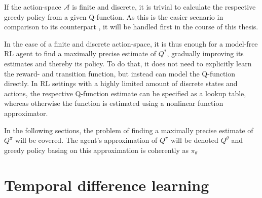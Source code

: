 If the action-space $\mathcal{A}$ is finite and discrete, it is trivial to calculate the respective greedy policy from a given Q-function. As this is the easier scenario in comparison to its counterpart , it will be handled first in the course of this thesis.

In the case of a finite and discrete action-space, it is thus enough for a model-free RL agent to find a maximally precise estimate of $Q^*$, gradually improving its estimates and thereby its policy. To do that, it does not need to explicitly learn the reward- and transition function, but instead can model the Q-function directly. In RL settings with a highly limited amount of discrete states and actions, the respective Q-function estimate can be specified as a lookup table, whereas otherwise the function is estimated using a nonlinear function approximator.

In the following sections, the problem of finding a maximally precise estimate of $Q^\pi$ will be covered. The agent's approximation of $Q^\pi$ will be denoted $Q^\theta$ and greedy policy basing on this approximation is coherently as $\pi_{\theta}$
\section{Temporal difference learning}



